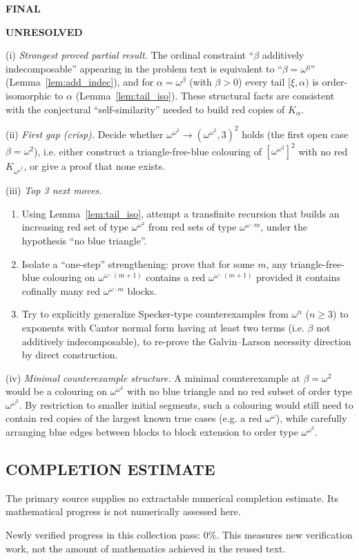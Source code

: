 \bigskip
\noindent\textbf{FINAL}

\textbf{UNRESOLVED}

(i) \emph{Strongest proved partial result.}
The ordinal constraint ``$\beta$ additively indecomposable'' appearing in the problem text is equivalent to ``$\beta=\omega^\eta$'' (Lemma~\ref{lem:add_indec}), and for $\alpha=\omega^\beta$ (with $\beta>0$) every tail $[\xi,\alpha)$ is order-isomorphic to $\alpha$ (Lemma~\ref{lem:tail_iso}).
These structural facts are consistent with the conjectural ``self-similarity'' needed to build red copies of $K_\alpha$.

(ii) \emph{First gap (crisp).}
Decide whether $\omega^{\omega^2}\to(\omega^{\omega^2},3)^2$ holds (the first open case $\beta=\omega^2$), i.e. either construct a triangle-free-blue colouring of $[\omega^{\omega^2}]^2$ with no red $K_{\omega^{\omega^2}}$, or give a proof that none exists.

(iii) \emph{Top 3 next moves.}
\begin{enumerate}
\item Using Lemma~\ref{lem:tail_iso}, attempt a transfinite recursion that builds an increasing red set of type $\omega^{\omega^2}$ from red sets of type $\omega^{\omega\cdot m}$, under the hypothesis ``no blue triangle''.
\item Isolate a ``one-step'' strengthening: prove that for some $m$, any triangle-free-blue colouring on $\omega^{\omega\cdot(m+1)}$ contains a red $\omega^{\omega\cdot(m+1)}$ provided it contains cofinally many red $\omega^{\omega\cdot m}$ blocks.
\item Try to explicitly generalize Specker-type counterexamples from $\omega^n$ ($n\ge 3$) to exponents with Cantor normal form having at least two terms (i.e. $\beta$ not additively indecomposable), to re-prove the Galvin--Larson necessity direction by direct construction.
\end{enumerate}

(iv) \emph{Minimal counterexample structure.}
A minimal counterexample at $\beta=\omega^2$ would be a colouring on $\omega^{\omega^2}$ with no blue triangle and no red subset of order type $\omega^{\omega^2}$.
By restriction to smaller initial segments, such a colouring would still need to contain red copies of the largest known true cases (e.g. a red $\omega^\omega$), while carefully arranging blue edges between blocks to block extension to order type $\omega^{\omega^2}$.




\subsection*{COMPLETION ESTIMATE}
The primary source supplies no extractable numerical completion estimate. Its mathematical progress is not numerically assessed here.

Newly verified progress in this collection pass: $0\%$. This measures new verification work, not the amount of mathematics achieved in the reused text.
